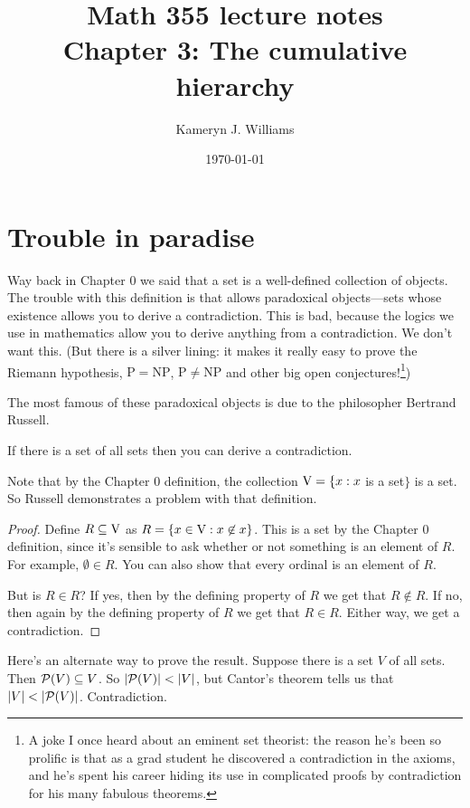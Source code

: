\documentclass[10pt]{amsart}
\title{Math 355 lecture notes \\ Chapter 3: The cumulative hierarchy}
\author{Kameryn J. Williams}
\date{\today}
\begin{document}
\maketitle

\section{Trouble in paradise}

Way back in Chapter 0 we said that a set is a well-defined collection of objects. The trouble with this definition is that allows paradoxical objects---sets whose existence allows you to derive a contradiction. This is bad, because the logics we use in mathematics allow you to derive anything from a contradiction. We don't want this. (But there is a silver lining: it makes it really easy to prove the Riemann hypothesis, $\mathrm P = \mathrm{NP}$, $\mathrm P \ne \mathrm{NP}$ and other big open conjectures!\footnote{A joke I once heard about an eminent set theorist: the reason he's been so prolific is that as a grad student he discovered a contradiction in the axioms, and he's spent his career hiding its use in complicated proofs by contradiction for his many fabulous theorems.})

The most famous of these paradoxical objects is due to the philosopher Bertrand Russell.

\begin{theorem}
If there is a set of all sets then you can derive a contradiction.
\end{theorem}

Note that by the Chapter 0 definition, the collection $\mathrm{V} = \{ x : x$ is a set$\}$ is a set. So Russell demonstrates a problem with that definition.

\begin{proof}
Define $R \subseteq \mathrm{V}$ as $R = \{ x \in \mathrm{V} : x \not \in x \}$. This is a set by the Chapter 0 definition, since it's sensible to ask whether or not something is an element of $R$. For example, $\emptyset \in R$. You can also show that every ordinal is an element of $R$. 

But is $R \in R$? If yes, then by the defining property of $R$ we get that $R \not \in R$. If no, then again by the defining property of $R$ we get that $R \in R$. Either way, we get a contradiction.
\end{proof}

Here's an alternate way to prove the result. Suppose there is a set $V$ of all sets. Then $\mathcal{P}(V) \subseteq V$. So $\left\lvert \mathcal{P}(V) \right\rvert < \left\lvert V \right\rvert$, but Cantor's theorem tells us that $\left\lvert V \right\rvert < \left\lvert \mathcal{P}(V) \right\rvert$. Contradiction.
\end{document}
